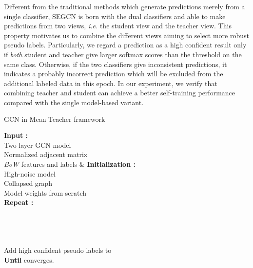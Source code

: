 \documentclass[letterpaper]{article} \usepackage{aaai19}  \usepackage{times}  \usepackage{helvet}  \usepackage{courier}  \usepackage{url}  \usepackage{graphicx}  \usepackage{algorithm}
\begin{document}
Different from the traditional methods which generate predictions merely from a single classifier, SEGCN is born with the dual classifiers and able to make predictions from two views, \emph{i.e.} the student view and the teacher view. This property motivates us to combine the different views aiming to select more robust pseudo labels. Particularly, we regard a prediction as a high confident result only if \emph{both} student and teacher give larger softmax scores than the threshold  on the same class. Otherwise, if the two classifiers give inconsistent predictions, it indicates a probably incorrect prediction which will be excluded from the additional labeled data in this epoch. In our experiment, we verify that combining teacher and student can achieve a better self-training performance compared with the single model-based variant.

\begin{algorithm}[t]
    \caption{GCN in Mean Teacher framework}\label{alg:Mean Teacher}
    \label{alg:train SEGCN}
    \begin{algorithmic}[1]
    \STATE \textbf{Input :} \\
    \quad Two-layer GCN model  \\  
    \quad Normalized adjacent matrix  \\  		
    \quad \emph{BoW} features and labels  \& 
    \STATE \textbf{Initialization :} \\
    \quad High-noise model  \\
    \quad Collapsed graph  \\
    \quad Model weights  from scratch \\
    \STATE \textbf{Repeat :}
    \STATE \quad   \\
    \STATE \quad   \\
    \STATE \quad   \\
    \STATE \quad   \\
    \STATE \quad   \\
    \STATE \quad Add high confident pseudo labels to \\
    \STATE \textbf{Until}  converges.
    \end{algorithmic}
\end{algorithm}
\end{document}
